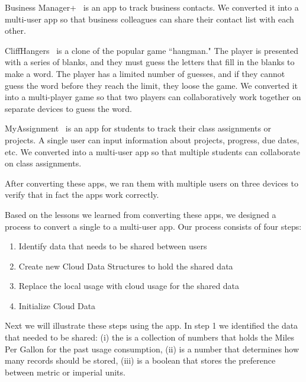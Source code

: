 \documentclass{sigplanconf}
\begin{document}
Business Manager+~\cite{BusinessManager} is an app to track business contacts.  We converted it into a multi-user app so that business colleagues can share their contact list with each other.

CliffHangers~\cite{CliffHangers} is a clone of the popular game ``hangman."  The player is presented with a series of blanks, and they must guess the letters that fill in the blanks to make a word.  The player has a limited number of guesses, and if they cannot guess the word before they reach the limit, they loose the game.  We converted it into a multi-player game so that two players can collaboratively work together on separate devices to guess the word.

MyAssignment~\cite{MyAssignments} is an app for students to track their class assignments or projects.  A single user can input information about projects, progress, due dates, etc.  We converted into a multi-user app so that multiple students can collaborate on class assignments.

After converting these apps, we ran them with multiple users on three devices to verify that in fact the apps work correctly. 

Based on the lessons we learned from converting these \numFormative apps, we designed a process to convert  a single to a multi-user app.  Our process consists of four steps:   
\begin{enumerate}
\item Identify data that needs to be shared between users

\item Create new Cloud Data Structures to hold the shared data

\item Replace the local usage with cloud usage for the shared data

\item Initialize Cloud Data
\end{enumerate}

Next we will illustrate these steps using the \MT app.  In step 1 we identified the data that needed to be shared: 
(i) the  is a collection of numbers that holds the Miles Per Gallon for the past usage consumption, 
(ii)  is a number that determines how many records should be stored, 
(iii)  is a boolean that stores the preference between metric or imperial units.
   
\end{document}
